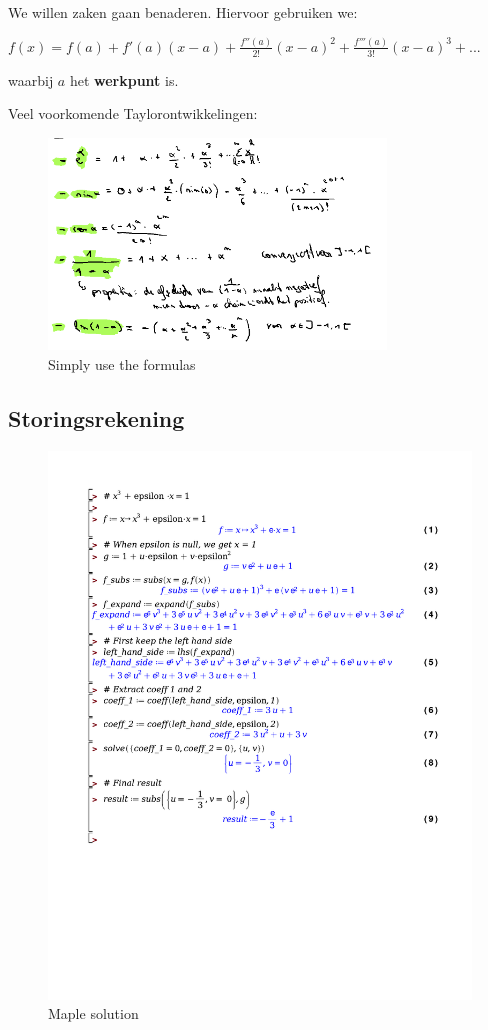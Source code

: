 \documentclass[a4paper]{report}
\begin{document}
We willen zaken gaan benaderen. Hiervoor gebruiken we:

$ f(x) = f(a) + f'(a)(x-a) + \frac{f''(a)}{2!}(x-a)^2 + \frac{f'''(a)}{3!}(x-a)^3 + ... $

waarbij $a$ het \textbf{werkpunt} is.

Veel voorkomende Taylorontwikkelingen:

\begin{figure}[H]
	\centering
	\includegraphics[width=0.8\textwidth]{assets/veel_voorkomend_taylor.png}
	\caption{Simply use the formulas}
	\label{fig:veel_voorkomend_taylor}
\end{figure}

\subsection*{Storingsrekening}

\begin{figure}[H]
	\centering
	\includegraphics[width=\textwidth]{./storing.pdf}
	\caption{Maple solution}
	\label{sol:storing}
\end{figure}
\end{document}
